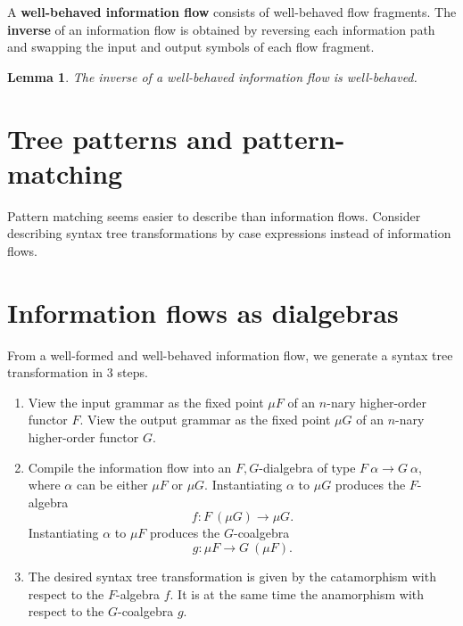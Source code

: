 \documentclass{amsart}
\gdef\R{\rightarrow}
\newtheorem{lemma}[subsection]{Lemma}
\begin{document}
\bigbreak

A \textbf{well-behaved information flow} consists of well-behaved
flow fragments. The \textbf{inverse} of an information flow is
obtained by reversing each information path and swapping the
input and output symbols of each flow fragment.

\begin{lemma}
The inverse of a well-behaved information flow is well-behaved.
\end{lemma}



\section{Tree patterns and pattern-matching}

Pattern matching seems easier to describe than information flows.
Consider describing syntax tree transformations by case
expressions instead of information flows.



\section{Information flows as dialgebras}

From a well-formed and well-behaved information flow, we generate
a syntax tree transformation in 3 steps.
\begin{enumerate}
\item View the input grammar as the fixed point $\mu F$ of an
$n$-nary higher-order functor $F$. View the output grammar as the
fixed point $\mu G$ of an $n$-nary higher-order functor $G$.
\item Compile the information flow into an $F,G$-dialgebra of
type $F~\alpha\R G~\alpha$, where $\alpha$ can be either $\mu F$
or $\mu G$. Instantiating $\alpha$ to $\mu G$ produces the
$F$-algebra
\[
f : F~(\mu G) \R \mu G.
\]
Instantiating $\alpha$ to $\mu F$ produces the $G$-coalgebra
\[
g : \mu F \R G~(\mu F).
\]
\item The desired syntax tree transformation is given by the
catamorphism with respect to the $F$-algebra $f$. It is at the
same time the anamorphism with respect to the $G$-coalgebra $g$.
\end{enumerate}
\end{document}
